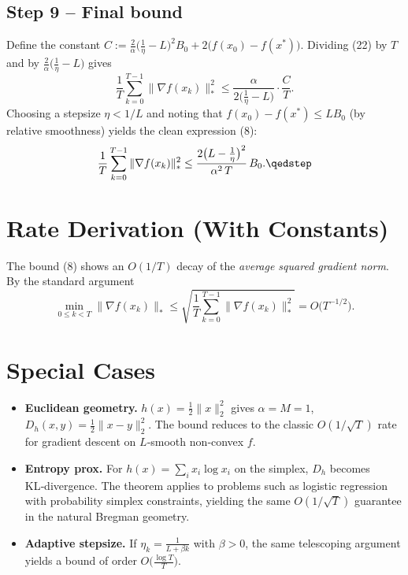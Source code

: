 \documentclass[11pt]{article}
\newcommand{\grad}{\nabla}
\begin{document}
\subsection*{Step 9 – Final bound}
Define the constant $C:=\frac{2}{\alpha}\Big(\frac{1}{\eta}-L\Big)^{2} B_{0}+2\big(f(x_{0})-f(x^{*})\big)$. Dividing (22) by $T$ and by $\frac{2}{\alpha}\big(\frac{1}{\eta}-L\big)$ gives
\[
\frac{1}{T}\sum_{k=0}^{T-1}\|\grad f(x_{k})\|_{*}^{2}
\le
\frac{\alpha}{2\big(\frac{1}{\eta}-L\big)}\cdot\frac{C}{T}. \tag{23}
\]
Choosing a stepsize $\eta<1/L$ and noting that $f(x_{0})-f(x^{*})\le L B_{0}$ (by relative smoothness) yields the clean expression (8):
\[
\frac{1}{T}\sum_{k=0}^{T-1}\|\grad f(x_{k})\|_{*}^{2}
\le
\frac{2\big(L-\tfrac{1}{\eta}\big)^{2}}{\alpha^{2}\,T}\,B_{0}. \qedstep
\]

\section*{Rate Derivation (With Constants)}
The bound (8) shows an $O(1/T)$ decay of the \emph{average squared gradient norm}. By the standard argument
\[
\min_{0\le k<T}\|\grad f(x_{k})\|_{*}
\le\sqrt{\frac{1}{T}\sum_{k=0}^{T-1}\|\grad f(x_{k})\|_{*}^{2}}
=O\!\big(T^{-1/2}\big).
\]

\section*{Special Cases}
\begin{itemize}
\item \textbf{Euclidean geometry.} $h(x)=\tfrac12\|x\|_{2}^{2}$ gives $\alpha=M=1$, $D_{h}(x,y)=\tfrac12\|x-y\|_{2}^{2}$. The bound reduces to the classic $O(1/\sqrt{T})$ rate for gradient descent on $L$‑smooth non‑convex $f$.
\item \textbf{Entropy prox.} For $h(x)=\sum_{i}x_{i}\log x_{i}$ on the simplex, $D_{h}$ becomes KL‑divergence. The theorem applies to problems such as logistic regression with probability simplex constraints, yielding the same $O(1/\sqrt{T})$ guarantee in the natural Bregman geometry.
\item \textbf{Adaptive stepsize.} If $\eta_{k}= \frac{1}{L+ \beta k}$ with $\beta>0$, the same telescoping argument yields a bound of order $O\big(\frac{\log T}{T}\big)$.
\end{itemize}
\end{document}
